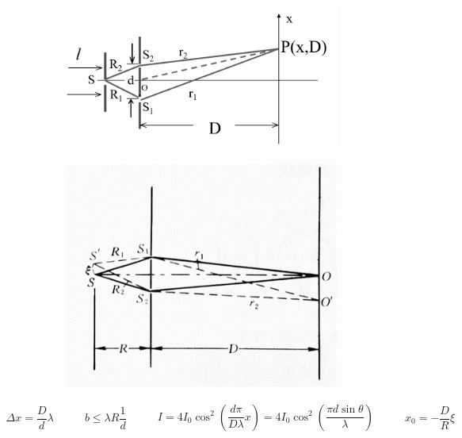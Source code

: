 \begin{figure}[H]
  \centering
  \begin{subfigure}{.55\textwidth}
    \centering
    \includegraphics[width=\linewidth]{figures/Young-Exp}
  \end{subfigure}
  \begin{subfigure}{.35\textwidth}
    \centering
    \includegraphics[width=\linewidth]{figures/Young-Exp-2}
  \end{subfigure}
\end{figure}

\begin{equation*}
  \begin{aligned}
    \Delta x = \dfrac{D}{d} \lambda 
  \end{aligned}
  \quad\quad 
  \begin{aligned}
    b \leq \lambda R \dfrac{1}{d} 
  \end{aligned}
  \quad\quad 
  \begin{aligned}
    I = 4 I_0 \cos^2 \left( \dfrac{d \pi}{D \lambda} x  \right) = 4 I_0 \cos^2 \left( \dfrac{\pi d \sin \theta}{\lambda}  \right)
  \end{aligned}
  \quad\quad 
  \begin{aligned}
    x_0 = - \dfrac{D}{R} \xi
  \end{aligned}
\end{equation*}

